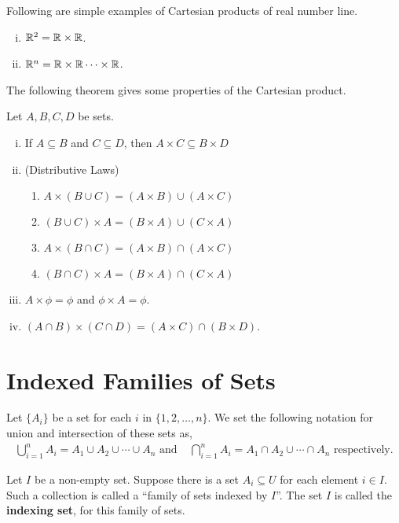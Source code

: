 \documentclass[a4paper,english,12pt]{article}
\begin{document}
\begin{exmp} Following are simple examples of Cartesian products of real number line.
\begin{enumerate}[(i)]
\item $\mathbb{R}^{2} = \mathbb{R} \times \mathbb{R}$.
\item $\mathbb{R}^{n} = \mathbb{R} \times \mathbb{R} \dots \times \mathbb{R}$.
\end{enumerate}
\end{exmp}

The following theorem gives some properties of the Cartesian product.
\begin{thm}
 Let $A, B, C, D$ be sets.
 \begin{enumerate}[i)]
  \item If $A \subseteq B$ and $C \subseteq D$, then $A \times C \subseteq B \times D$
  \item (Distributive Laws)
  \begin{enumerate}
   \item $A \times (B \cup C) = (A \times B) \cup (A \times C)$ 
   \item $(B \cup C) \times A = (B \times A) \cup (C \times A)$
   \item $A \times (B \cap C) = (A \times B) \cap (A \times C)$
   \item $(B \cap C) \times A = (B \times A) \cap (C \times A)$
  \end{enumerate}
  \item $A \times \phi = \phi$ and $\phi \times A = \phi$.
  \item $(A \cap B) \times (C \cap D) = (A \times C) \cap (B \times D)$.
\end{enumerate}

\end{thm}

\section{Indexed Families of Sets}
Let $\{A_i\}$ be a set for each $i$ in $\{1,2,\ldots,n\}$. We set the following notation for union and intersection of these sets as, 
\begin{align*}
 \bigcup_{i = 1}^{n} A_{i} = A_{1} \cup A_{2} \cup \cdots \cup A_{n} \text{ and }& 
 \bigcap_{i = 1}^{n} A_{i} = A_{1} \cap A_{2} \cup \cdots \cap A_{n} \text{ respectively}.
\end{align*}

\begin{defn}
 Let $I$ be a non-empty set. Suppose there is a set $A_{i} \subseteq U$ for each element $i \in I$. Such a collection is called a ``family of sets indexed by $I$''. The set $I$ is called the \textbf{indexing set}, for this family of sets. 
\end{defn}
\end{document}

